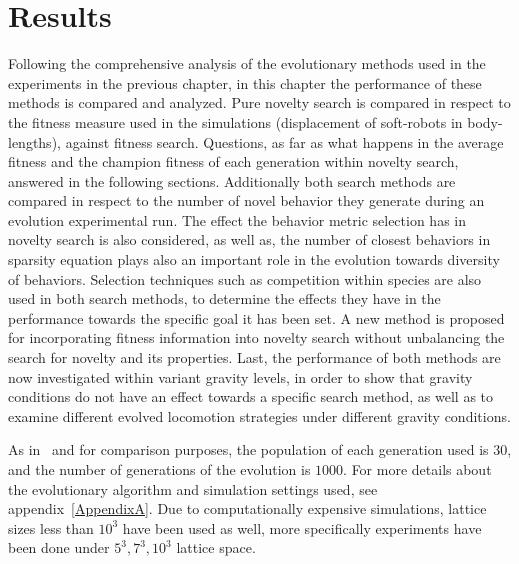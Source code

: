 
\chapter{Results} %

\label{Results} %


Following the comprehensive analysis of the evolutionary methods used in the experiments in the previous chapter, in this chapter the performance of these methods is compared and analyzed. Pure novelty search is compared in respect to the fitness measure used in the simulations (displacement of soft-robots in body-lengths), against fitness search. Questions, as far as what happens in the average fitness and the champion fitness of each generation within novelty search, answered in the following sections. Additionally both search methods are compared in respect to the number of novel behavior they generate during an evolution experimental run. The effect the behavior metric selection has in novelty search is also considered, as well as, the number of closest behaviors in sparsity equation plays also an important role in the evolution towards diversity of behaviors. Selection techniques such as competition within species are also used in both search methods, to determine the effects they have in the performance towards the specific goal it has been set. A new method is proposed for incorporating fitness information into novelty search without unbalancing the search for novelty and its properties. Last, the performance of both methods are now investigated within variant gravity levels, in order to show that gravity conditions do not have an effect towards a specific search method, as well as to examine different evolved locomotion strategies under different gravity conditions.

As in~\cite{cheney2013unshackling} and for comparison purposes, the population of each generation used is $30$, and the number of generations of the evolution is $1000$. For more details about the evolutionary algorithm and simulation settings used, see appendix~\ref{AppendixA}. Due to computationally expensive simulations, lattice sizes less than $10^3$ have been used as well, more specifically experiments have been done under $5^3, 7^3, 10^3$ lattice space.

